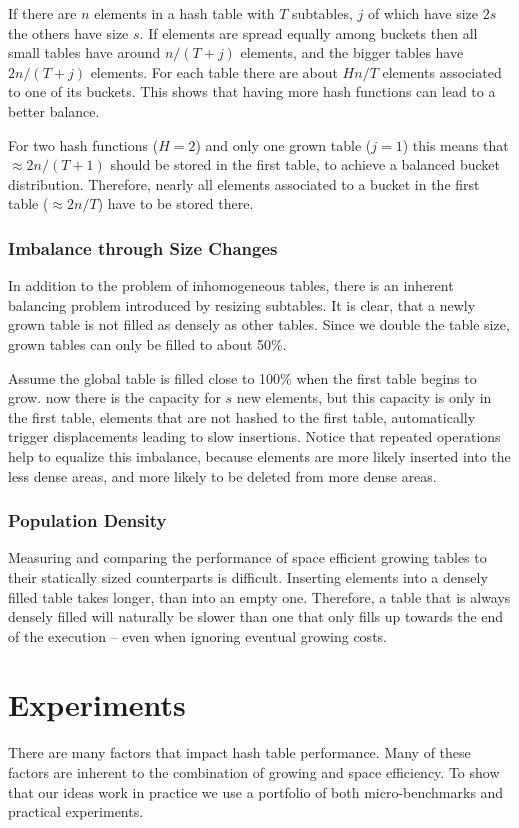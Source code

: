 \documentclass[a4paper,UKenglish]{lipics-v2016}
\begin{document}
If there are $n$ elements in a hash table with $T$ subtables,
$j$ of which have size $2s$ the others have size $s$. If elements are
spread equally among buckets then all small tables have around
$n/(T+j)$ elements, and the bigger tables have $2n/(T+j)$ elements.
For each table there are about $Hn/T$ elements associated to one of
its buckets.  This shows that having more hash functions can lead to a
better balance.

For two hash functions ($H=2$) and only one grown table ($j=1$) this
means that $\approx 2n/(T+1)$ should be stored in the first table, to
achieve a balanced bucket distribution.  Therefore, nearly all
elements associated to a bucket in the first table ($\approx 2n/T$)
have to be stored there.

\subsubsection*{Imbalance through Size Changes}
In addition to the problem of inhomogeneous tables, there is an
inherent balancing problem introduced by resizing subtables. It is
clear, that a newly grown table is not filled as densely as other
tables.  Since we double the table size, grown tables can only be
filled to about 50\%.

Assume the global table is filled close to 100\% when the first table
begins to grow.  now there is the capacity for $s$ new elements, but
this capacity is only in the first table, elements that are not hashed
to the first table, automatically trigger displacements leading to
slow insertions.  Notice that repeated operations help to equalize
this imbalance, because elements are more likely inserted into the
less dense areas, and more likely to be deleted from more dense areas.

\subsubsection*{Population Density}
Measuring and comparing the performance of space efficient growing
tables to their statically sized counterparts is difficult.  Inserting
elements into a densely filled table takes longer, than into an empty
one.  Therefore, a table that is always densely filled will naturally
be slower than one that only fills up towards the end of the
execution -- even when ignoring eventual growing costs.

\section{Experiments}
\label{sec:exp}
There are many factors that impact hash table performance.  Many of
these factors are inherent to the combination of growing and space
efficiency.  To show that our ideas work in practice we use a
portfolio of both micro-benchmarks and practical experiments.
\end{document}
